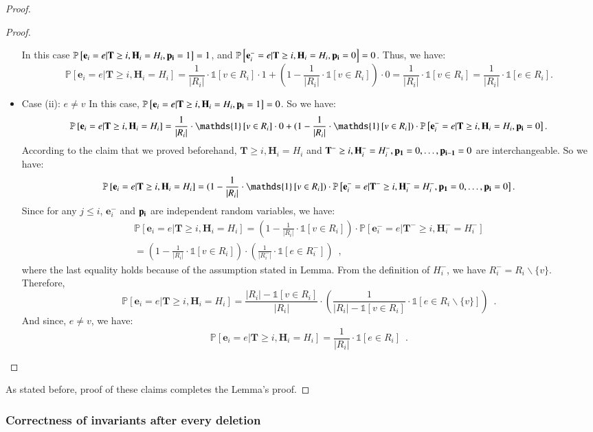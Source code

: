 \documentclass[11pt]{article}
\renewcommand{\Pr}[1]{\ensuremath{\mathbb{P}\left[#1\right]}}
\newcommand{\ind}[1]{\ensuremath{\mathds{1}\left[#1\right]}}
\newcommand{\bE}{\ensuremath{\mathbf{e}}}
\newcommand{\bT}{\ensuremath{\mathbf{T}}}
\newcommand{\bH}{\ensuremath{\mathbf{H}}}
\begin{document}
\begin{proof}
\begin{proof}
\begin{itemize}
In this case 
$\Pr{\bE_i = e|\bT \geq i, \bH_i = H_i, \bold{p_i} = 1} = 1$, and $\Pr{\bE_i^- = e|\bT \geq i, \bH_i = H_i, \bold{p_i} = 0} = 0$. Thus, we have: 
$$\Pr{\bE_i = e|\bT \geq i, \bH_i = H_i} = 
\frac{1}{|R_i|} \cdot \ind{v \in R_i} \cdot 1
+ (1 - \frac{1}{|R_i|} \cdot \ind{v \in R_i}) \cdot 0 = \frac{1}{|R_i|} \cdot \ind{v \in R_i} = \frac{1}{|R_i|} \cdot \ind{e \in R_i}.
 $$
\item Case (ii): $e \neq v$
In this case, $\Pr{\bE_i = e|\bT \geq i, \bH_i = H_i, \bold{p_i} = 1} = 0$. So we have: 
$$\Pr{\bE_i = e|\bT \geq i, \bH_i = H_i} =
\frac{1}{|R_i|} \cdot \ind{v \in R_i} \cdot 0
+ (1 - \frac{1}{|R_i|} \cdot \ind{v \in R_i}) \cdot 
\Pr{\bE_i^- = e|\bT \geq i, \bH_i = H_i, \bold{p_i} = 0}. $$
According to the claim that we proved beforehand, $\bT \geq i, \bH_i = H_i$ and $\bT^- \geq i, \bH_i^- = H_i^-, \bold{p_1} = 0, \dots, \bold{p_{i - 1}} = 0$ are interchangeable. So we have: 
$$\Pr{\bE_i = e|\bT \geq i, \bH_i = H_i} =
(1 - \frac{1}{|R_i|} \cdot \ind{v \in R_i}) \cdot 
\Pr{\bE_i^- = e| \bT^- \geq i, \bH_i^- = H_i^-, \bold{p_1} = 0, \dots, \bold{p_i} = 0}.
$$
Since for any $j \leq i$, $\bE_i^-$ and $\bold{p_i}$ are independent random variables, we have: 
\begin{align*}
\Pr{\bE_i = e|\bT \geq i, \bH_i = H_i} =
(1 - \frac{1}{|R_i|} \cdot \ind{v \in R_i}) \cdot 
\Pr{\bE_i^- = e| \bT^- \geq i, \bH_i^- = H_i^-} \\
= (1 - \frac{1}{|R_i|} \cdot \ind{v \in R_i}) \cdot 
\left(\frac{1}{|R_i^-|} \cdot \ind{e \in R_i^-}\right) \enspace, 
\end{align*}
where the last equality holds because of the assumption stated in Lemma. From the definition of $H_i^-$, we have $R_i^- = R_i \backslash \{v\}$. Therefore, 
$$\Pr{\bE_i = e|\bT \geq i, \bH_i = H_i} = 
\frac{|R_i| - \ind{v \in R_i}}{|R_i|} \cdot 
\left(\frac{1}{|R_i| - \ind{v \in R_i} } \cdot \ind{e \in R_i \backslash \{v\}}\right) \enspace .
$$
And since, $e \neq v$, we have: 
$$\Pr{\bE_i = e|\bT \geq i, \bH_i = H_i} =
\frac{1}{|R_i|} \cdot \ind{e \in R_i} \enspace .$$
\end{itemize}
\end{proof}
As stated before, proof of these claims completes the Lemma's proof. 
\end{proof}







\subsubsection{Correctness of invariants after every deletion}
\end{document}
